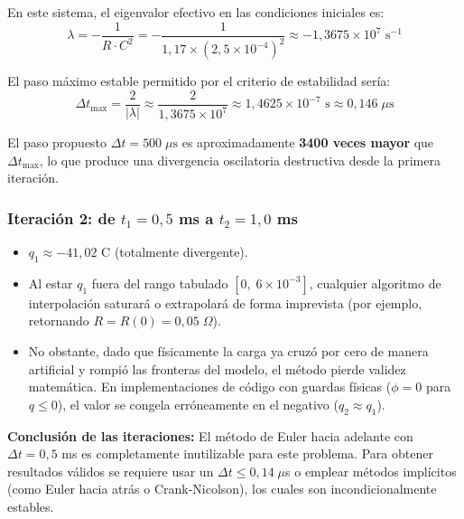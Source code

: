 \documentclass[12pt,a4paper]{article}
\begin{document}
En este sistema, el eigenvalor efectivo en las condiciones iniciales es:
\begin{equation}
    \lambda = -\frac{1}{R\cdot C^2}
            = -\frac{1}{1{,}17\times(2{,}5\times10^{-4})^2}
            \approx -1{,}3675\times10^7 \text{ s}^{-1}
\end{equation}

El paso máximo estable permitido por el criterio de estabilidad sería:
\begin{equation}
    \Delta t_{\max} = \frac{2}{|\lambda|} \approx \frac{2}{1{,}3675\times10^7}
                    \approx 1{,}4625\times10^{-7} \text{ s} \approx 0{,}146 \;\mu\text{s}
\end{equation}

El paso propuesto $\Delta t = 500\;\mu\text{s}$ es aproximadamente \textbf{3400 veces
mayor} que $\Delta t_{\max}$, lo que produce una divergencia oscilatoria destructiva desde la primera iteración.

\subsubsection*{Iteración 2: de $t_1 = 0{,}5$ ms a $t_2 = 1{,}0$ ms}

\begin{itemize}
    \item $q_1 \approx -41{,}02$ C (totalmente divergente).
    \item Al estar $q_1$ fuera del rango tabulado $[0,\;6\times10^{-3}]$, cualquier algoritmo de interpolación saturará o extrapolará de forma imprevista (por ejemplo, retornando $R = R(0) = 0{,}05\;\Omega$).
    \item No obstante, dado que físicamente la carga ya cruzó por cero de manera artificial y rompió las fronteras del modelo, el método pierde validez matemática. En implementaciones de código con guardas físicas ($\phi = 0$ para $q \le 0$), el valor se congela erróneamente en el negativo ($q_2 \approx q_1$).
\end{itemize}

\textbf{Conclusión de las iteraciones:} El método de Euler hacia adelante con $\Delta t = 0{,}5$ ms
es completamente inutilizable para este problema. Para obtener resultados válidos se requiere usar un $\Delta t \le 0{,}14 \;\mu$s o emplear métodos implícitos (como Euler hacia atrás o Crank-Nicolson), los cuales son incondicionalmente estables.

\end{document}
